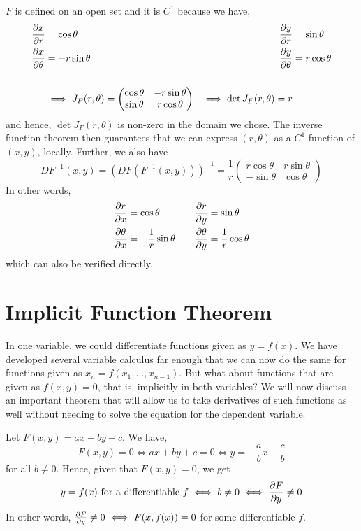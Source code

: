 \documentclass[../Analysis-3.tex]{subfiles}
\begin{document}
\( F \) is defined on an open set and it is \( C^1 \) because we have,
\begin{alignat*}{4}
   \pdv{x}{r}      &= \cos \theta \quad    &\pdv{y}{r}      &= \sin \theta \\
   \pdv{x}{\theta} &= -r \sin \theta \quad &\pdv{y}{\theta} &= r \cos \theta \\
   \\
   &\implies J_F(r, \theta) = 
   \begin{pmatrix}
     \cos \theta & -r \sin \theta \\ 
     \sin \theta & r \cos \theta
   \end{pmatrix}
   &\implies \det J_F(r, \theta) = r 
\end{alignat*}
and hence, \( \det J_F(r, \theta) \) is non-zero in the domain we chose. The inverse function theorem then guarantees that we can express \( (r, \theta) \) as a \( C^1 \) function of \( (x, y) \), locally. Further, we also have
\[ 
 DF^{-1}(x,y) = (DF(F^{-1}(x,y)))^{-1} = \frac 1r \begin{pmatrix}
   r \cos \theta & r \sin \theta \\
   -\sin \theta & \cos \theta 
 \end{pmatrix}
 \]
 In other words,
 \begin{alignat*}{4}
   \pdv{r}{x}      &= \cos \theta \quad    &\pdv{r}{y}      &= \sin \theta \\
   \pdv{\theta}{x} &= -\frac 1r \sin \theta \quad &\pdv{\theta}{y} &= \frac 1r \cos \theta \\ 
\end{alignat*}
which can also be verified directly.
\pagebreak

\section{Implicit Function Theorem}

In one variable, we could differentiate functions given as \( y = f(x) \). We have developed several variable calculus far enough that we can now do the same for functions given as \( x_n = f(x_1, \dots, x_{n-1}) \). But what about functions that are given as \( f(x,y) = 0 \), that is, implicitly in both variables? We will now discuss an important theorem that will allow us to take derivatives of such functions as well without needing to solve the equation for the dependent variable.

\begin{Eg}{}{}
 Let \( F(x,y) = ax+by+c \). We have,
 \[ 
  F(x,y) = 0 \iff ax+by+c = 0 \iff y = -\frac ab x - \frac cb 
  \]
  for all \( b \neq 0 \). Hence, given that \( F(x,y) = 0 \), we get
  \[ 
   y = f(x) \text{ for a differentiable } f \iff b \neq 0 \iff \pdv{F}{y} \neq 0
   \]
In other words, \( \pdv{F}{y} \neq 0 \iff F(x,f(x)) = 0 \) for some differentiable \( f \).
 \end{Eg}
\end{document}
